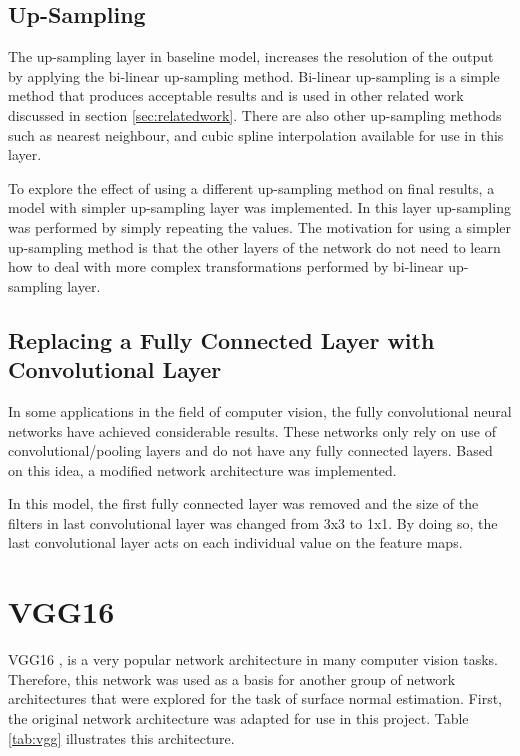 \subsection{Up-Sampling}

The up-sampling layer in baseline model, increases the resolution of the output by applying the bi-linear up-sampling method. Bi-linear up-sampling is a simple method that produces acceptable results and is used in other related work discussed in section \ref{sec:relatedwork}. There are also other up-sampling methods such as nearest neighbour, and cubic spline interpolation available for use in this layer.  

To explore the effect of using a different up-sampling method on final results, a model with simpler up-sampling layer was implemented. In this layer up-sampling was performed by simply repeating the values. The motivation for using a simpler up-sampling method is that the other layers of the network do not need to learn how to deal with more complex transformations performed by bi-linear up-sampling layer.  

\subsection{Replacing a Fully Connected Layer with Convolutional Layer}

In some applications in the field of computer vision, the fully convolutional neural networks have achieved considerable results. These networks only rely on use of convolutional/pooling layers and do not have any fully connected layers. Based on this idea, a modified network architecture was implemented. 

In this model, the first fully connected layer was removed and the size of the filters in last convolutional layer was changed from 3x3 to 1x1. By doing so, the last convolutional layer acts on each individual value on the feature maps. 

\section{VGG16}

VGG16 \cite{vgg}, is a very popular network architecture in many computer vision tasks. Therefore, this network was used as a basis for another group of network architectures that were explored for the task of surface normal estimation. First, the original network architecture was adapted for use in this project. Table \ref{tab:vgg} illustrates this architecture. 

